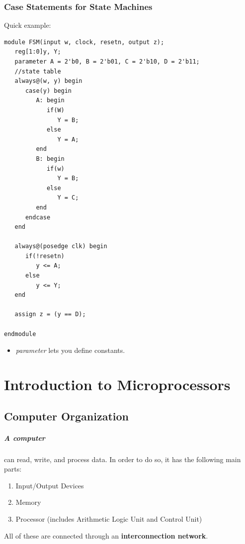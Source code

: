 \documentclass[a4paper,12pt]{report}
\begin{document}

\subsection{Case Statements for State Machines}
Quick example:
\begin{lstlisting}
module FSM(input w, clock, resetn, output z);
   reg[1:0]y, Y;
   parameter A = 2'b0, B = 2'b01, C = 2'b10, D = 2'b11;
   //state table
   always@(w, y) begin
      case(y) begin
         A: begin
            if(W) 
               Y = B;
            else  
               Y = A;
         end
         B: begin
            if(w)
               Y = B;
            else 
               Y = C;
         end
      endcase
   end

   always@(posedge clk) begin
      if(!resetn)
         y <= A;
      else  
         y <= Y;
   end

   assign z = (y == D);

endmodule
\end{lstlisting}
\begin{itemize}
\item \textit{parameter} lets you define constants. 
\end{itemize}



\chapter{Introduction to Microprocessors}
\section{Computer Organization}
\paragraph{A computer } can read, write, and process data. In order to do so, it has the following main parts:
\begin{enumerate}
\item Input/Output Devices
\item Memory
\item Processor (includes Arithmetic Logic Unit and Control Unit)
\end{enumerate}
All of these are connected through an \textbf{interconnection network}.
\end{document}
